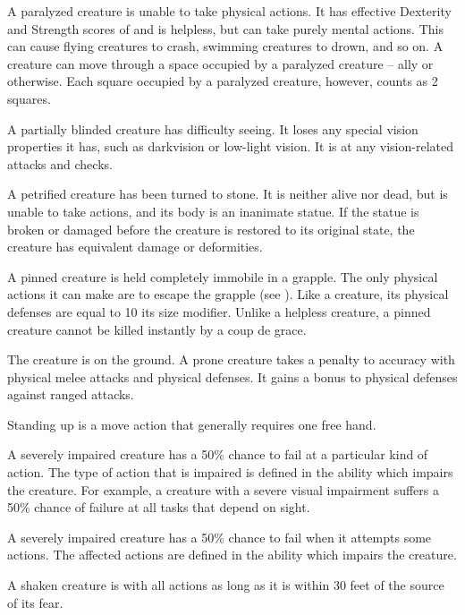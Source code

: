  A paralyzed creature is unable to take physical actions. It has effective Dexterity and Strength scores of  and is helpless, but can take purely mental actions. This can cause flying creatures to crash, swimming creatures to drown, and so on. A creature can move through a space occupied by a paralyzed creature -- ally or otherwise. Each square occupied by a paralyzed creature, however, counts as 2 squares.

 A partially blinded creature has difficulty seeing. It loses any special vision properties it has, such as darkvision or low-light vision. It is \impaired at any vision-related attacks and checks.

 A petrified creature has been turned to stone. It is neither alive nor dead, but is unable to take actions, and its body is an inanimate statue. If the statue is broken or damaged before the creature is restored to its original state, the creature has equivalent damage or deformities.

 A pinned creature is held completely immobile in a grapple.
The only physical actions it can make are to escape the grapple (see ).
Like a  creature, its physical defenses are equal to 10 \add its size modifier.
Unlike a helpless creature, a pinned creature cannot be killed instantly by a coup de grace.

 The creature is on the ground. A prone creature takes a  penalty to accuracy with physical melee attacks and physical defenses. It gains a  bonus to physical defenses against ranged attacks.

Standing up is a move action that generally requires one free hand.

 A severely impaired creature has a 50\% chance to fail at a particular kind of action. The type of action that is impaired is defined in the ability which impairs the creature. For example, a creature with a severe visual impairment suffers a 50\% chance of failure at all tasks that depend on sight.

 A severely impaired creature has a 50\% chance to fail when it attempts some actions. The affected actions are defined in the ability which impairs the creature.

 A shaken creature is \impaired with all actions as long as it is within 30 feet of the source of its fear.

